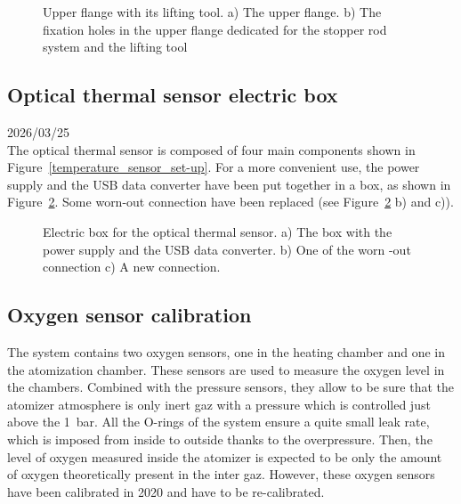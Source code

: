 \documentclass[../main.tex]{subfiles}
\begin{document}
\vspace{0mm}
\begin{figure}[H]
    \centering
        
        \caption[Upper flange with its lifting tool.]{Upper flange with its lifting tool. a) The upper flange. b) The fixation holes in the upper flange dedicated for the stopper rod system and the lifting tool}
        \label{upper_flange_lifting}
\end{figure}
\FloatBarrier
\vspace{0mm}


\subsection{Optical thermal sensor electric box}

2026/03/25\\

The optical thermal sensor is composed of four main components shown in Figure~\ref{temperature_sensor_set-up}. For a more convenient use, the power supply and the USB data converter have been put together in a box, as shown in Figure~\ref{th_sensor_box}. Some worn-out connection have been replaced (see Figure~\ref{th_sensor_box} b) and c)).

\vspace{0mm}
\begin{figure}[H]
    \centering
        
        \caption[Electric box for the optical thermal sensor.]{Electric box for the optical thermal sensor. a) The box with the power supply and the USB data converter. b) One of the worn
        -out connection c) A new connection.}
        \label{th_sensor_box}
\end{figure}
\FloatBarrier
\vspace{0mm}

\subsection{Oxygen sensor calibration}

The system contains two oxygen sensors, one in the heating chamber and one in the atomization chamber. These sensors are used to measure the oxygen level in the chambers. Combined with the pressure sensors, they allow to be sure that the atomizer atmosphere is only inert gaz with a pressure which is controlled just above the 1~bar. All the O-rings of the system ensure a quite small leak rate, which is imposed from inside to outside thanks to the overpressure. Then, the level of oxygen measured inside the atomizer is expected to be only the amount of oxygen theoretically present in the inter gaz. However, these oxygen sensors have been calibrated in 2020 and have to be re-calibrated.
\end{document}
